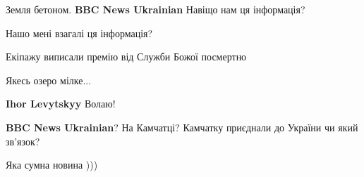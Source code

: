 \begin{itemize}
Земля бетоном. \textbf{BBC News Ukrainian} Навіщо нам ця інформація?

 
Нашо мені взагалі ця інформація?

 
Екіпажу виписали премію від Служби Божої посмертно

 
Якесь озеро мілке...

\begin{itemize}
 
\textbf{Ihor Levytskyy} Волаю!🤣🤣🤣
\end{itemize}

 
\textbf{BBC News Ukrainian}? На Камчатці? Камчатку приєднали до України чи який зв'язок?

 
Яка сумна новина )))

\begin{itemize}
 

\end{itemize}
\end{itemize}
